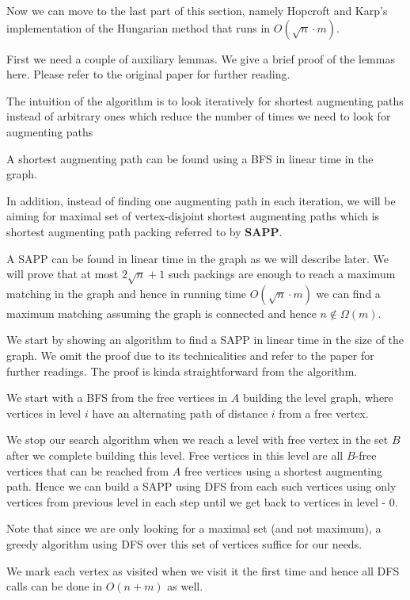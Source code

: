 Now we can move to the last part of this section, namely Hopcroft and Karp's implementation\cite{hopcroft1973n} of the Hungarian method that runs in $O(\sqrt n \cdot m)$.

First we need a couple of auxiliary lemmas. We give a brief proof of the lemmas here. Please refer to the original paper for further reading.

The intuition of the algorithm is to look iteratively for shortest augmenting paths instead of arbitrary ones which reduce the number of times we need to look for augmenting paths

A shortest augmenting path can be found using a BFS in linear time in the graph.

In addition, instead of finding one augmenting path in each iteration, we will be aiming for maximal set of vertex-disjoint shortest augmenting paths which is shortest augmenting path packing referred to by \textbf{SAPP}.

A SAPP can be found in linear time in the graph as we will describe later. We will prove that at most $2\sqrt n + 1$ such packings are enough to reach a maximum matching in the graph and hence in running time $O(\sqrt n \cdot m)$ we can find a maximum matching assuming the graph is connected and hence $n \notin \Omega(m)$.

We start by showing an algorithm to find a SAPP in linear time in the size of the graph. We omit the proof due to its technicalities and refer to the paper for further readings. The proof is kinda straightforward from the algorithm.

We start with a BFS from the free vertices in $A$ building the level graph, where vertices in level $i$ have an alternating path of distance $i$ from a free vertex.

We stop our search algorithm when we reach a level with free vertex in the set $B$ after we complete building this level. Free vertices in this level are all $B$-free vertices that can be reached from $A$ free vertices using a shortest augmenting path. Hence we can build a SAPP using DFS from each such vertices using only vertices from previous level in each step until we get back to vertices in level - 0.

Note that since we are only looking for a maximal set (and not maximum), a greedy algorithm using DFS over this set of vertices suffice for our needs.

We mark each vertex as visited when we visit it the first time and hence all DFS calls can be done in $O(n + m)$ as well. 

